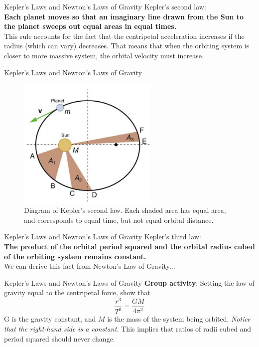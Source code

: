 \documentclass{beamer}
\begin{document}
\begin{frame}{Kepler's Laws and Newton's Laws of Gravity}
Kepler's second law: \\
\vspace{0.5cm}
\textbf{Each planet moves so that an imaginary line drawn from the Sun to the planet sweeps out equal areas in equal times.} \\
\vspace{0.5cm}
This rule accounts for the fact that the centripetal acceleration increases if the radius (which can vary) decreases.  That means that when the orbiting system is closer to more massive system, the orbital velocity must increase.
\end{frame}

\begin{frame}{Kepler's Laws and Newton's Laws of Gravity}
\begin{figure}
\centering
\includegraphics[width=0.6\textwidth]{figures/kepler2.png}
\caption{\label{fig:kepler2} Diagram of Kepler's second law.  Each shaded area has equal area, and corresponds to equal time, but not equal orbital distance.}
\end{figure}
\end{frame}

\begin{frame}{Kepler's Laws and Newton's Laws of Gravity}
Kepler's third law: \\
\vspace{0.5cm}
\textbf{The product of the orbital period squared and the orbital radius cubed of the orbiting system remains constant.} \\
\vspace{0.5cm}
We can derive this fact from Newton's Law of Gravity...
\end{frame}

\begin{frame}{Kepler's Laws and Newton's Laws of Gravity}
\textbf{Group activity}: Setting the law of gravity equal to the centripetal force, show that
\begin{equation}
\frac{r^3}{T^2} = \frac{GM}{4\pi^2}
\end{equation}
G is the gravity constant, and $M$ is the mass of the system being orbited.  \textit{Notice that the right-hand side is a constant.}  This implies that ratios of radii cubed and period squared should never change.
\end{frame}
\end{document}
